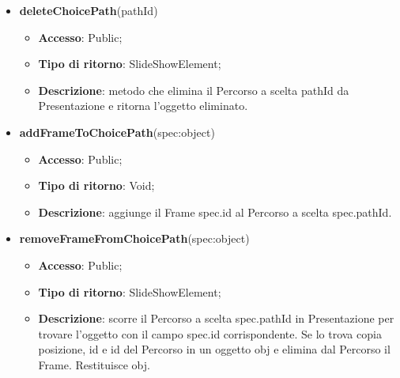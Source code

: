 {\begin{itemize}
\begin{itemize}
			\end{itemize}
			\item \textbf{deleteChoicePath}(pathId)
			\begin{itemize}
				\item \textbf{Accesso}: Public;
				\item \textbf{Tipo di ritorno}: SlideShowElement;
				\item \textbf{Descrizione}: metodo che elimina il Percorso a scelta pathId da Presentazione e ritorna l'oggetto eliminato.
			\end{itemize}
			\item \textbf{addFrameToChoicePath}(spec:object)
			\begin{itemize}
				\item \textbf{Accesso}: Public;
				\item \textbf{Tipo di ritorno}: Void;
				\item \textbf{Descrizione}: aggiunge il Frame spec.id al Percorso a scelta spec.pathId.
			\end{itemize}
			\item \textbf{removeFrameFromChoicePath}(spec:object)
			\begin{itemize}
				\item \textbf{Accesso}: Public;
				\item \textbf{Tipo di ritorno}: SlideShowElement;
				\item \textbf{Descrizione}: scorre il Percorso a scelta spec.pathId in Presentazione per trovare l’oggetto con il campo spec.id corrispondente. Se lo trova copia posizione, id e id del Percorso in un oggetto obj e elimina dal Percorso\ped{g} il Frame. Restituisce obj.
			\end{itemize}
		\end{itemize}
		
	}
